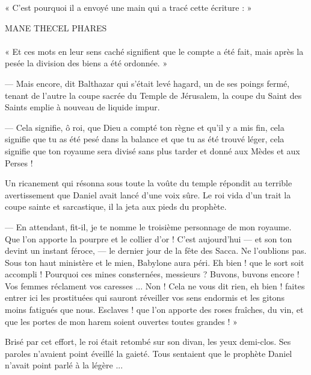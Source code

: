 \documentclass[a4paper, 11pt, oneside, polutonikogreek, french]{article}
\begin{document}
« C'est pourquoi il a envoyé une main qui a tracé cette écriture : »

\begin{center}
MANE THECEL PHARES
\end{center}
\paragraph{}
« Et ces mots en leur sens caché signifient que le compte a été fait, mais après la pesée la division des biens a été ordonnée. »

--- Mais encore, dit Balthazar qui s'était levé hagard, un de ses poings fermé, tenant de l'autre la coupe sacrée du Temple de Jérusalem, la coupe du Saint des Saints emplie à nouveau de liquide impur.

--- Cela signifie, ô roi, que Dieu a compté ton règne et qu'il y a mis fin, cela signifie que tu as été pesé dans la balance et que tu as été trouvé léger, cela signifie que ton royaume sera divisé sans plus tarder et donné aux Mèdes et aux Perses !

\bigskip
\centerline{\EightStarTaper}
\centerline{\EightStarTaper\EightStarTaper}
\bigskip

Un ricanement qui résonna sous toute la voûte du temple répondit au terrible avertissement que Daniel avait lancé d'une voix sûre. Le roi vida d'un trait la coupe sainte et sarcastique, il la jeta aux pieds du prophète.

--- En attendant, fit-il, je te nomme le troisième personnage de mon royaume. Que l'on apporte la pourpre et le collier d'or ! C'est aujourd'hui --- et son ton devint un instant féroce, --- le dernier jour de la fête des Sacca. Ne l'oublions pas. Sous ton haut ministère et le mien, Babylone aura péri. Eh bien ! que le sort soit accompli ! Pourquoi ces mines consternées, messieurs ? Buvons, buvons encore ! Vos femmes réclament vos caresses ... Non ! Cela ne vous dit rien, eh bien ! faites entrer ici les prostituées qui sauront réveiller vos sens endormis et les gitons moins fatigués que nous. Esclaves ! que l'on apporte des roses fraîches, du vin, et que les portes de mon harem soient ouvertes toutes grandes ! »

\bigskip
\centerline{\EightStarTaper}
\centerline{\EightStarTaper\EightStarTaper}
\bigskip

Brisé par cet effort, le roi était retombé sur son divan, les yeux demi-clos. Ses paroles n'avaient point éveillé la gaieté. Tous sentaient que le prophète Daniel n'avait point parlé à la légère ...
\end{document}
